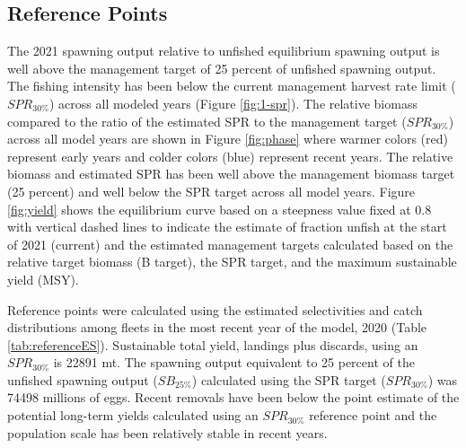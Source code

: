 \documentclass[11pt,
  english,
  a4paper,
]{article}
\begin{document}
\leavevmode\tagmcend\tagstructend


\hypertarget{reference-points-1}{%
\subsection{Reference Points}\label{reference-points-1}}

\leavevmode\tagmcend\tagstructend


The 2021 spawning output relative to unfished equilibrium spawning output is well above the management target of 25 percent of unfished spawning output. The fishing intensity has been below the current management harvest rate limit ({\(SPR_{30\%}\)\leavevmode\tagmcend\tagstructend}) across all modeled years (Figure \ref{fig:1-spr}). The relative biomass compared to the ratio of the estimated SPR to the management target ({\(SPR_{30\%}\)\leavevmode\tagmcend\tagstructend}) across all model years are shown in Figure \ref{fig:phase} where warmer colors (red) represent early years and colder colors (blue) represent recent years. The relative biomass and estimated SPR has been well above the management biomass target (25 percent) and well below the SPR target across all model years. Figure \ref{fig:yield} shows the equilibrium curve based on a steepness value fixed at 0.8 with vertical dashed lines to indicate the estimate of fraction unfish at the start of 2021 (current) and the estimated management targets calculated based on the relative target biomass (B target), the SPR target, and the maximum sustainable yield (MSY).

\leavevmode\tagmcend\tagstructend\par


Reference points were calculated using the estimated selectivities and catch distributions among fleets in the most recent year of the model, 2020 (Table \ref{tab:referenceES}). Sustainable total yield, landings plus discards, using an {\(SPR_{30\%}\)\leavevmode\tagmcend\tagstructend} is 22891 mt. The spawning output equivalent to 25 percent of the unfished spawning output ({\(SB_{25\%}\)\leavevmode\tagmcend\tagstructend}) calculated using the SPR target ({\(SPR_{30\%}\)\leavevmode\tagmcend\tagstructend}) was 74498 millions of eggs. Recent removals have been below the point estimate of the potential long-term yields calculated using an {\(SPR_{30\%}\)\leavevmode\tagmcend\tagstructend} reference point and the population scale has been relatively stable in recent years.
\end{document}
